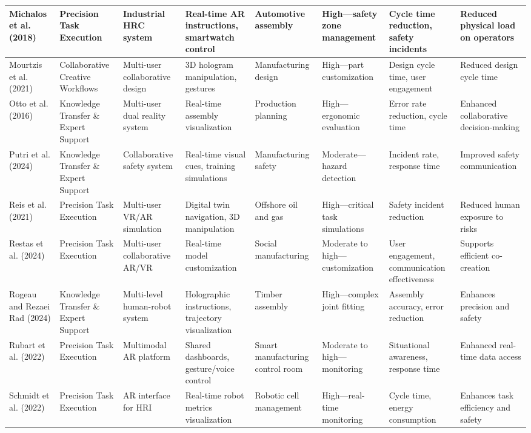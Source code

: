 {\begin{landscape}
\begin{longtable}{@{}p{1.8cm}p{1.8cm}p{1.8cm}p{1.8cm}p{1.8cm}p{1.8cm}p{1.8cm}p{1.8cm}@{}}
\midrule
Michalos et al. (2018) & Precision Task Execution & Industrial HRC system & Real-time AR instructions, smartwatch control & Automotive assembly & High—safety zone management & Cycle time reduction, safety incidents & Reduced physical load on operators \\
\midrule
Mourtzis et al. (2021) & Collaborative Creative Workflows & Multi-user collaborative design & 3D hologram manipulation, gestures & Manufacturing design & High—part customization & Design cycle time, user engagement & Reduced design cycle time \\
\midrule
Otto et al. (2016) & Knowledge Transfer \& Expert Support & Multi-user dual reality system & Real-time assembly visualization & Production planning & High—ergonomic evaluation & Error rate reduction, cycle time & Enhanced collaborative decision-making \\
\midrule
Putri et al. (2024) & Knowledge Transfer \& Expert Support & Collaborative safety system & Real-time visual cues, training simulations & Manufacturing safety & Moderate—hazard detection & Incident rate, response time & Improved safety communication \\
\midrule
Reis et al. (2021) & Precision Task Execution & Multi-user VR/AR simulation & Digital twin navigation, 3D manipulation & Offshore oil and gas & High—critical task simulations & Safety incident reduction & Reduced human exposure to risks \\
\midrule
Restas et al. (2024) & Precision Task Execution & Multi-user collaborative AR/VR & Real-time model customization & Social manufacturing & Moderate to high—customization & User engagement, communication effectiveness & Supports efficient co-creation \\
\midrule
Rogeau and Rezaei Rad (2024) & Knowledge Transfer \& Expert Support & Multi-level human-robot system & Holographic instructions, trajectory visualization & Timber assembly & High—complex joint fitting & Assembly accuracy, error reduction & Enhances precision and safety \\
\midrule
Rubart et al. (2022) & Precision Task Execution & Multimodal AR platform & Shared dashboards, gesture/voice control & Smart manufacturing control room & Moderate to high—monitoring & Situational awareness, response time & Enhanced real-time data access \\
\midrule
Schmidt et al. (2022) & Precision Task Execution & AR interface for HRI & Real-time robot metrics visualization & Robotic cell management & High—real-time monitoring & Cycle time, energy consumption & Enhances task efficiency and safety \\

\end{longtable}
\end{landscape}}
